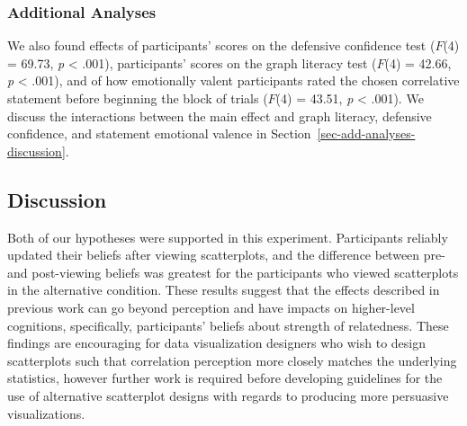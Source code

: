 \documentclass[manuscript,screen,review,anonymous]{acmart}
\begin{document}
\begin{table}

\caption{\label{tbl-condition-interact}Statistics for the significant
main effect of rating time and the significant interaction between
rating time and condition on the difference between pre- and post-
scatterplot viewing ratings for standard and alternative plots. Odds
ratios and equivalent Cohen's \emph{d} effect sizes are also shown.}


\end{table}%

\subsubsection{Additional Analyses}\label{sec-add-analyses}

We also found effects of participants' scores on the defensive
confidence test (\(F\)(4) = 69.73, \emph{p} \textless{} .001),
participants' scores on the graph literacy test (\(F\)(4) = 42.66,
\emph{p} \textless{} .001), and of how emotionally valent participants
rated the chosen correlative statement before beginning the block of
trials (\(F\)(4) = 43.51, \emph{p} \textless{} .001). We discuss the
interactions between the main effect and graph literacy, defensive
confidence, and statement emotional valence in
Section~\ref{sec-add-analyses-discussion}.

\subsection{Discussion}\label{sec-main-discussion}

Both of our hypotheses were supported in this experiment. Participants
reliably updated their beliefs after viewing scatterplots, and the
difference between pre- and post-viewing beliefs was greatest for the
participants who viewed scatterplots in the alternative condition. These
results suggest that the effects described in previous work can go
beyond perception and have impacts on higher-level cognitions,
specifically, participants' beliefs about strength of relatedness. These
findings are encouraging for data visualization designers who wish to
design scatterplots such that correlation perception more closely
matches the underlying statistics, however further work is required
before developing guidelines for the use of alternative scatterplot
designs with regards to producing more persuasive visualizations.
\end{document}
